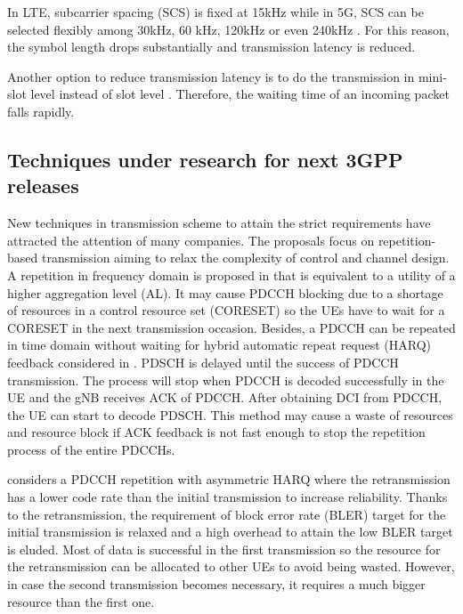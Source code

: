 \documentclass[conference,10pt]{IEEEtran}
\begin{document}
In LTE, subcarrier spacing (SCS) is fixed at 15kHz while in 5G, SCS can be selected flexibly among 30kHz, 60 kHz, 120kHz or even 240kHz \cite{ad2}. For this reason, the symbol length drops substantially and transmission latency is reduced.

Another option to reduce transmission latency is to do the transmission in mini-slot level instead of slot level \cite{ad3}. Therefore, the waiting time of an incoming packet falls rapidly.

\subsection{Techniques under research for next 3GPP releases}\label{IBB}
New techniques in transmission scheme to attain the strict requirements have attracted the attention of many companies. The proposals focus on repetition-based transmission aiming to relax the complexity of control and channel design. A repetition in frequency domain is proposed in \cite{b1} that is equivalent to a utility of a higher aggregation level (AL). It may cause PDCCH blocking due to a shortage of resources in a control resource set (CORESET) so the UEs have to wait for a CORESET in the next transmission occasion. Besides, a PDCCH can be repeated in time domain without waiting for hybrid automatic repeat request (HARQ) feedback considered in \cite{b2}. PDSCH is delayed until the success of PDCCH transmission. The process will stop when PDCCH is decoded successfully in the UE and the gNB receives ACK of PDCCH. After obtaining DCI from PDCCH, the UE can start to decode PDSCH. This method may cause a waste of resources and resource block if ACK feedback is not fast enough to stop the repetition process of the entire PDCCHs. 

\cite{b3} considers a PDCCH repetition with asymmetric HARQ where the retransmission has a lower code rate than the initial transmission to increase reliability. Thanks to the retransmission, the requirement of block error rate (BLER) target for the initial transmission is relaxed and a high overhead to attain the low BLER target is eluded. Most of data is successful in the first transmission so the resource for the retransmission can be allocated to other UEs to avoid being wasted. However, in case the second transmission becomes necessary, it requires a much bigger resource than the first one.
\end{document}
